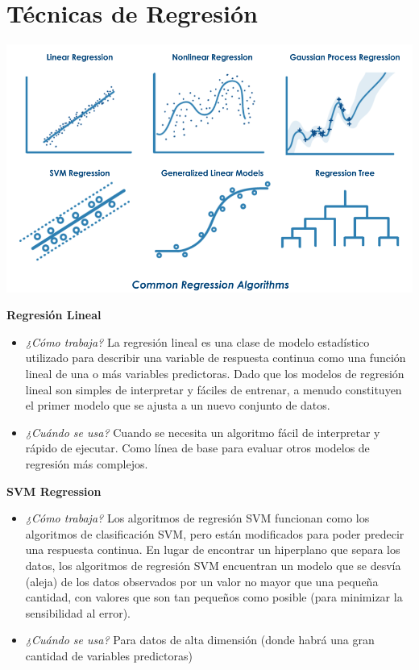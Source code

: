 \documentclass[]{book}
\begin{document}
\hypertarget{tecnicas-de-regresion}{%
\section{Técnicas de Regresión}\label{tecnicas-de-regresion}}

\includegraphics[width=0.8\linewidth]{imgs/regressiontechniques}

\textbf{Regresión Lineal}

\begin{itemize}
\item
  \emph{¿Cómo trabaja?} La regresión lineal es una clase de modelo estadístico utilizado para
  describir una variable de respuesta continua como una función lineal de una o más variables predictoras. Dado que los modelos de regresión lineal son simples de interpretar y fáciles de entrenar,
  a menudo constituyen el primer modelo que se ajusta a un nuevo conjunto de datos.
\item
  \emph{¿Cuándo se usa?} Cuando se necesita un algoritmo fácil de interpretar y rápido de ejecutar. Como línea de base para evaluar otros modelos de regresión más complejos.
\end{itemize}

\textbf{SVM Regression}

\begin{itemize}
\item
  \emph{¿Cómo trabaja?} Los algoritmos de regresión SVM funcionan como los algoritmos de clasificación SVM, pero están modificados para poder predecir una respuesta continua. En lugar de encontrar un hiperplano que
  separa los datos, los algoritmos de regresión SVM encuentran un modelo que se desvía (aleja) de los datos observados por un valor no mayor que una pequeña cantidad, con valores que son tan pequeños como
  posible (para minimizar la sensibilidad al error).
\item
  \emph{¿Cuándo se usa?} Para datos de alta dimensión (donde habrá una gran
  cantidad de variables predictoras)
\end{itemize}
\end{document}
